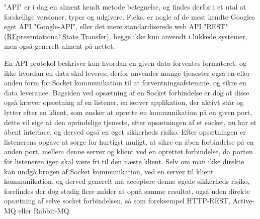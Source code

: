 "API" er i dag en alment kendt metode betegnelse, og findes derfor i et utal at forskellige versioner, typer og udgivere. F.eks. er nogle af de mest kendte Googles eget API "Google-API", eller det mere standardiserede web API "REST" (\underline{RE}presentational \underline{S}tate \underline{T}ransfer), begge ikke kun anvendt i lukkede systemer, men også generelt alment på nettet. \cite{codecademy_REST}

En API protokol beskriver kun hvordan en given data forventes formateret, og ikke hvordan en data skal leveres, derfor anvender mange tjenester også en eller anden form for Socket kommunikation til at forventningsafstemme, og sikre en data leverance. Bagsiden ved opsætning af en Socket forbindelse er dog at disse også kræver opsætning af en listener, en server applikation, der aktivt står og lytter efter en klient, som ønsker at oprette en kommunikation på en given port, dette vil sige at den oprindelige tjeneste, efter opsætningen af et socket, nu har et åbent interface, og derved også en øget sikkerheds risiko. Efter opsætningen er listenerens opgave at sørge for hurtigst muligt, at sikre en åben forbindelse på en anden port, mellem denne server og klient ved en oprettet forbindelse, da porten for listeneren igen skal være fri til den næste klient. \cite{WhatIsSocket} Selv om man ikke direkte kan undgå brugen af Socket kommunikation, ved en server til klient kommunikation, og derved generelt må acceptere denne øgede sikkerheds risiko, forefindes der dog stadig flere måder at opnå samme resultat, også uden direkte opsætning af selve socket forbindelsen, så som foreksempel HTTP-REST, Active-MQ eller Rabbit-MQ. \cite{SocketAlternatives}

